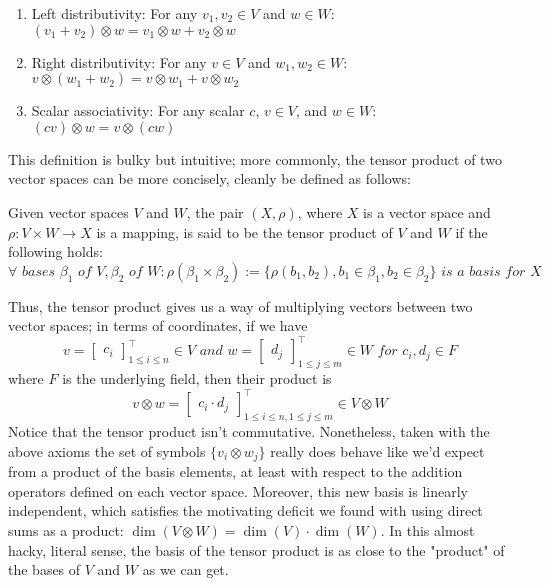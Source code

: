 \documentclass{article}
\newcommand{\n}{\leavevmode \newline}
\begin{document}
\begin{enumerate}
	\item Left distributivity: For any $ v_1, v_2 \in V $ and $ w \in W $: $ (v_1 + v_2) \otimes w = v_1 \otimes w + v_2 \otimes w $
	\item Right distributivity: For any $ v \in V $ and $ w_1, w_2 \in W $: $ v \otimes (w_1 + w_2) = v \otimes w_1 + v \otimes w_2 $
	\item Scalar associativity: For any scalar $ c $, $ v \in V $, and $ w \in W $: $ (c v) \otimes w = v \otimes (c w) $
\end{enumerate}
\n
This definition is bulky but intuitive; more commonly, the tensor product of two vector spaces can be more concisely, cleanly be defined as follows:
\n
\begin{adjustwidth}{1cm}{1cm}
    Given vector spaces $ V $ and $ W $, the pair $ (X, \rho) $, where $ X $ is a vector space and $ \rho: V \times W \rightarrow X $ is a mapping, is said to be the tensor product of $ V $ and $ W $ if the following holds:
        $$ \forall \textit{ bases } \beta_1 \textit{ of } V, \beta_2 \textit{ of } W: \rho \left( \beta_1 \times \beta_2 \right) := \{ \rho(b_1, b_2), b_1 \in \beta_1, b_2 \in \beta_2 \} \textit{ is a basis for } X $$
\end{adjustwidth}
\n
Thus, the tensor product gives us a way of multiplying vectors between two vector spaces; in terms of coordinates, if we have
    $$ v = \begin{bmatrix} c_i \end{bmatrix}_{1 \leq i \leq n}^\intercal \in V \textit{ and } w = \begin{bmatrix} d_j \end{bmatrix}_{1 \leq j \leq m}^\intercal \in W \textit{ for }c_i, d_j \in F $$
where $ F $ is the underlying field, then their product is
    $$ v \otimes w = \begin{bmatrix} c_i \cdot d_j \end{bmatrix}_{1 \leq i \leq n, 1 \leq j \leq m}^\intercal \in V \otimes W $$
Notice that the tensor product isn't commutative. Nonetheless, taken with the above axioms the set of symbols $ \{ v_i \otimes w_j \} $ really does behave like we'd expect from a product of the basis elements, at least with respect to the addition operators defined on each vector space. Moreover, this new basis is linearly independent, which satisfies the motivating deficit we found with using direct sums as a product: $ \dim(V \otimes W) = \dim(V) \cdot \dim(W) $. In this almost hacky, literal sense, the basis of the tensor product is as close to the "product" of the bases of $ V $ and $ W $ as we can get.
\end{document}
